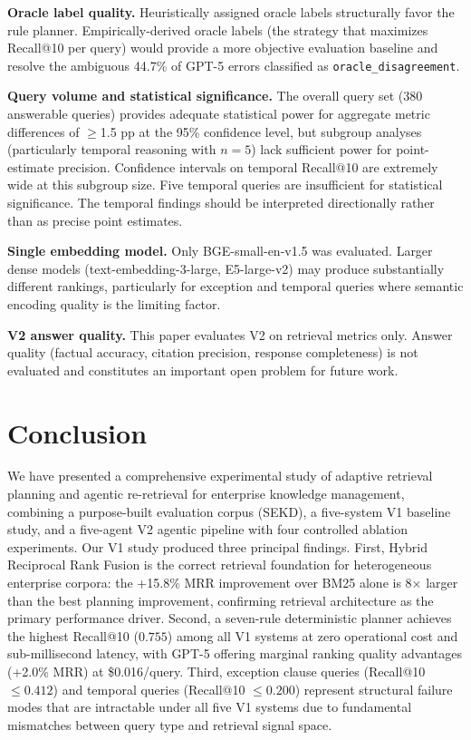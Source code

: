 \documentclass[11pt, a4paper]{article}
\begin{document}
\textbf{Oracle label quality.} Heuristically assigned oracle labels structurally favor the rule planner. Empirically-derived oracle labels (the strategy that maximizes Recall@10 per query) would provide a more objective evaluation baseline and resolve the ambiguous 44.7\% of GPT-5 errors classified as \texttt{oracle\_disagreement}.

\textbf{Query volume and statistical significance.} The overall query set (380 answerable queries) provides adequate statistical power for aggregate metric differences of $\geq$1.5 pp at the 95\% confidence level, but subgroup analyses (particularly temporal reasoning with $n{=}5$) lack sufficient power for point-estimate precision. Confidence intervals on temporal Recall@10 are extremely wide at this subgroup size. Five temporal queries are insufficient for statistical significance. The temporal findings should be interpreted directionally rather than as precise point estimates.

\textbf{Single embedding model.} Only BGE-small-en-v1.5 was evaluated. Larger dense models (text-embedding-3-large, E5-large-v2) may produce substantially different rankings, particularly for exception and temporal queries where semantic encoding quality is the limiting factor.

\textbf{V2 answer quality.} This paper evaluates V2 on retrieval metrics only. Answer quality (factual accuracy, citation precision, response completeness) is not evaluated and constitutes an important open problem for future work.

\section{Conclusion}
\label{sec:conclusion}

We have presented a comprehensive experimental study of adaptive retrieval planning and agentic re-retrieval for enterprise knowledge management, combining a purpose-built evaluation corpus (SEKD), a five-system V1 baseline study, and a five-agent V2 agentic pipeline with four controlled ablation experiments. Our V1 study produced three principal findings. First, Hybrid Reciprocal Rank Fusion is the correct retrieval foundation for heterogeneous enterprise corpora: the +15.8\% MRR improvement over BM25 alone is 8$\times$ larger than the best planning improvement, confirming retrieval architecture as the primary performance driver. Second, a seven-rule deterministic planner achieves the highest Recall@10 ($0.755$) among all V1 systems at zero operational cost and sub-millisecond latency, with GPT-5 offering marginal ranking quality advantages (+2.0\% MRR) at \$0.016/query. Third, exception clause queries (Recall@10 $\leq 0.412$) and temporal queries (Recall@10 $\leq 0.200$) represent structural failure modes that are intractable under all five V1 systems due to fundamental mismatches between query type and retrieval signal space.
\end{document}
